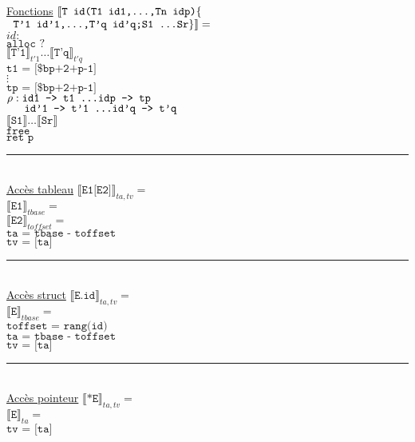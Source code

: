\documentclass[12pt,twocolumn]{report}
\begin{document}
    \underline{Fonctions}
    $\llbracket \texttt{T id(T1 id1,\dots,Tn idp)}\lbrace$\\
    \hphantom{aa} $\texttt{ T'1 id'1,\dots,T'q id'q;S1 \dots Sr}\rbrace \rrbracket= $\\
    $id:$\\
    \hphantom{aaaaaa}$\texttt{alloc ?} $\\
    \hphantom{aaaaaa}$\llbracket \texttt{T'1} \rrbracket_{t'1} \dots\llbracket \texttt{T'q} \rrbracket_{t'q} $\\
    \hphantom{aaaaaa}$\texttt{t1 = [\$bp+2+p-1]}$\\
    \hphantom{aaaaaa}$\vdots$\\
    \hphantom{aaaaaa}$\texttt{tp = [\$bp+2+p-1]}$\\
    \hphantom{aaaaaa}$\rho: \texttt{id1 --> t1 \dots idp --> tp}$\\
    \hphantom{aaaaaa}$\hphantom{aaa}\texttt{id'1 --> t'1 \dots id'q --> t'q}$\\
    \hphantom{aaaaaa}$\llbracket \texttt{S1} \rrbracket \dots\llbracket \texttt{Sr} \rrbracket$\\
    \hphantom{aaaaaa}$\texttt{free}$\\
    \hphantom{aaaaaa}$\texttt{ret p}$\\
\rule{9cm}{0.1pt}\\
    \underline{Accès tableau}
    $\llbracket \texttt{E1[E2]} \rrbracket_{ta,tv}= $\\
    $\llbracket \texttt{E1} \rrbracket_{tbase}= $\\
    $\llbracket \texttt{E2} \rrbracket_{toffset}=$\\
    $\texttt{ta = tbase - toffset}$\\
    $\texttt{tv = [ta]}$\\
\rule{9cm}{0.1pt}\\
    \underline{Accès struct}
    $\llbracket \texttt{E.id} \rrbracket_{ta,tv}= $\\
    $\llbracket \texttt{E} \rrbracket_{tbase}= $\\
    $\texttt{toffset = rang(id)}$\\
    $\texttt{ta = tbase - toffset}$\\
    $\texttt{tv = [ta]}$\\ 
\rule{9cm}{0.1pt}\\
    \underline{Accès pointeur}
    $\llbracket \texttt{*E} \rrbracket_{ta,tv}= $\\
    $\llbracket \texttt{E} \rrbracket_{ta}= $\\
    $\texttt{tv = [ta]}$ 
\end{document}
